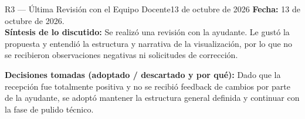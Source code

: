 \documentclass[11pt,a4paper]{article}
\begin{document}
	\vspace{0.4cm}
	
	\begin{revisionbox}{R3 — Última Revisión con el Equipo Docente}{13 de octubre de 2026}
		\noindent\textbf{Fecha:} 13 de octubre de 2026.\\
		\textbf{Síntesis de lo discutido:} Se realizó una revisión con la ayudante. Le gustó la propuesta y entendió la estructura y narrativa de la visualización, por lo que no se recibieron observaciones negativas ni solicitudes de corrección.
		
		\vspace{0.15cm}
		\noindent\textbf{Decisiones tomadas (adoptado / descartado y por qué):}
		Dado que la recepción fue totalmente positiva y no se recibió feedback de cambios por parte de la ayudante, se adoptó mantener la estructura general definida y continuar con la fase de pulido técnico.
	\end{revisionbox}
	
	\vspace{0.4cm}
	
\end{document}
